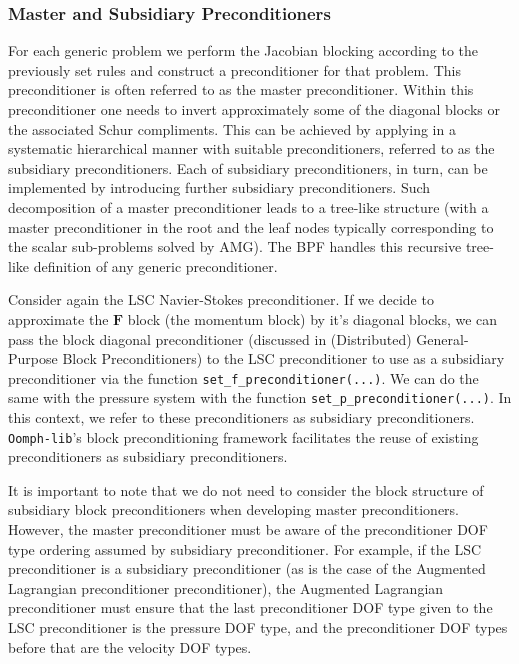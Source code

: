 \subsubsection{Master and Subsidiary Preconditioners}
For each generic problem we perform the Jacobian blocking according to the
previously set rules and construct a preconditioner for that problem. This
preconditioner is often referred to as the master preconditioner. Within this
preconditioner one needs to invert approximately some of the diagonal blocks or
the associated Schur compliments. This can be achieved by applying in a
systematic hierarchical manner with suitable preconditioners, referred to as
the subsidiary preconditioners. Each of subsidiary preconditioners, in turn,
can be implemented by introducing further subsidiary preconditioners. Such
decomposition of a master preconditioner leads to a tree-like structure (with a
master preconditioner in the root and the leaf nodes typically corresponding to
the scalar sub-problems solved by AMG). The BPF handles this recursive
tree-like definition of any generic preconditioner.

Consider again the LSC Navier-Stokes preconditioner. If we decide to approximate
the $\mathbf{F}$ block (the momentum block) by it's diagonal blocks, we can 
pass the block diagonal preconditioner (discussed in (Distributed) 
General-Purpose Block Preconditioners) to the LSC preconditioner to use as a 
subsidiary preconditioner via the function 
\texttt{set\_\allowbreak f\_\allowbreak preconditioner(...)}. We can do the 
same with the pressure system with the function 
\texttt{set\_\allowbreak p\_\allowbreak preconditioner(...)}. In this context, 
we refer to these preconditioners as subsidiary preconditioners. 
\texttt{Oomph-lib}'s block preconditioning framework facilitates the reuse of 
existing preconditioners as subsidiary preconditioners.

It is important to note that we do not need to consider the block structure of
subsidiary block preconditioners when developing master preconditioners.
However, the master preconditioner must be aware of the preconditioner DOF type
ordering assumed by subsidiary preconditioner. For example, if the LSC
preconditioner is a subsidiary preconditioner (as is the case of the Augmented
Lagrangian preconditioner preconditioner), the Augmented Lagrangian
preconditioner must ensure that the last preconditioner DOF type given to the
LSC preconditioner is the pressure DOF type, and the preconditioner DOF types
before that are the velocity DOF types.

